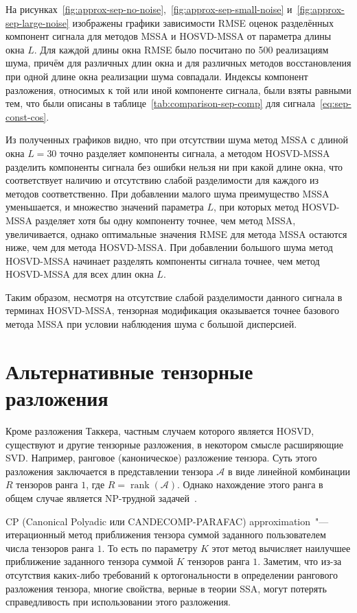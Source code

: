 \documentclass[specialist,
    substylefile = spbu.rtx,
    subf,href,colorlinks=true, 12pt]{disser}
\theoremstyle{plain}
\theoremstyle{definition}
\theoremstyle{remark}
\begin{document}
    На рисунках~\ref{fig:approx-sep-no-noise},~\ref{fig:approx-sep-small-noise} и~\ref{fig:approx-sep-large-noise}
    изображены графики зависимости RMSE оценок разделённых компонент сигнала для методов MSSA и HOSVD-MSSA от 
    параметра длины окна $L$.
    Для каждой длины окна RMSE было посчитано по 500 реализациям шума, причём для различных длин окна
    и для различных методов восстановления при одной длине окна реализации шума совпадали.
    Индексы компонент разложения, относимых к той или иной компоненте сигнала, были взяты равными тем, что
    были описаны в таблице~\ref{tab:comparison-sep-comp} для сигнала~\eqref{eq:sep-const-cos}.
    
    Из полученных графиков видно, что при отсутствии шума метод MSSA с длиной окна $L=30$ точно разделяет 
    компоненты сигнала, а методом HOSVD-MSSA разделить компоненты сигнала без ошибки нельзя ни при какой длине окна,
    что соответствует наличию и отсутствию слабой разделимости для каждого из методов соответственно.
    При добавлении малого шума преимущество MSSA уменьшается, и множество значений параметра $L$, при 
    которых метод HOSVD-MSSA разделяет хотя бы одну компоненту точнее, чем метод MSSA, увеличивается, однако
    оптимальные значения RMSE для метода MSSA остаются ниже, чем для метода HOSVD-MSSA.
    При добавлении большого шума метод HOSVD-MSSA начинает разделять компоненты сигнала точнее, чем метод HOSVD-MSSA
    для всех длин окна $L$.
    
    Таким образом, несмотря на отсутствие слабой разделимости данного сигнала в терминах HOSVD-MSSA, 
    тензорная модификация оказывается точнее базового метода MSSA при условии наблюдения шума с большой дисперсией.
   
    \section{Альтернативные тензорные разложения}\label{sec:other-decomp}
    Кроме разложения Таккера, частным случаем которого является HOSVD, существуют и другие тензорные разложения, 
    в некотором смысле расширяющие SVD. 
    Например, ранговое (каноническое) разложение тензора.
    Суть этого разложения заключается в представлении тензора $\mathcal{A}$ в виде линейной комбинации $R$ тензоров
    ранга $1$, где $R=\operatorname{rank}(\mathcal{A})$.
    Однако нахождение этого ранга в общем случае является NP-трудной задачей~\cite{NP-hard}.

    CP (Canonical Polyadic или CANDECOMP-PARAFAC) approximation~\cite{parafac1, parafac2}"--- итерационный метод
    приближения тензора суммой заданного пользователем числа тензоров ранга $1$.
    То есть по параметру $K$ этот метод вычисляет наилучшее приближение заданного тензора суммой $K$ тензоров ранга $1$.
    Заметим, что из-за отсутствия каких-либо требований к ортогональности в определении рангового разложения тензора,
    многие свойства, верные в теории SSA, могут потерять справедливость при использовании этого разложения.
\end{document}
